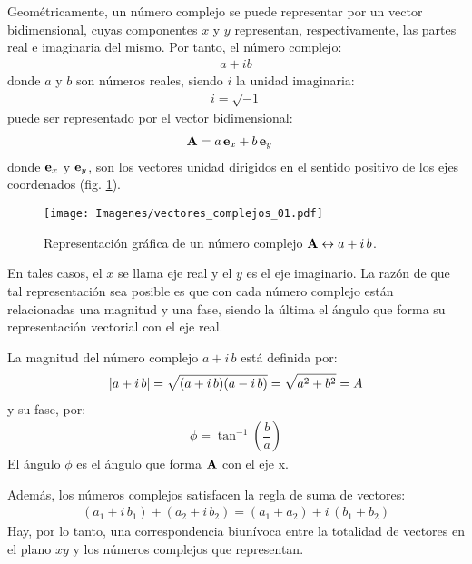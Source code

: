 \documentclass[12pt]{article}
\begin{document}
Geométricamente, un número complejo se puede representar por un vector bidimensional, cuyas componentes $x$ y $y$ representan, respectivamente, 
las partes real e imaginaria del mismo. Por tanto, el número complejo:
\begin{align}
    a + i b
    \label{eq:ecuacion_01_78}
\end{align}
donde $a$ y $b$ son números reales, siendo $i$ la unidad imaginaria:
\begin{align}
    i = \sqrt{-1}
    \label{eq:ecuacion_01_79}
\end{align}
puede ser representado por el vector bidimensional:
\begin{align}
    \vb{A} &= a \, \vb{e}_{x} + b \, \vb{e}_{y}
    \label{eq:ecuacion_01_80}
\end{align}
donde $\vb{e}_{x}$ y $\vb{e}_{y}$, son los vectores unidad dirigidos en el sentido positivo de los ejes coordenados (fig. \ref{fig:figura_01_23}). 
\begin{figure}[H]
    \centering
    \texttt{[image: Imagenes/vectores\_complejos\_01.pdf]}
    \caption{Representación gráfica de un número complejo $\vb{A} \leftrightarrow a + i \, b$.}
    \label{fig:figura_01_23}
\end{figure}
En tales casos, el $x$ se llama eje real y el $y$ es el eje imaginario. La razón de que tal representación sea posible es que con cada número complejo están relacionadas una magnitud y una fase, siendo la última el ángulo que forma su representación vectorial con el eje real.
\par
La magnitud del número complejo $a + i \, b$ está definida por:
\begin{align}
    \abs{a + i \, b} = \sqrt{(a + i \, b) (a - i \, b)} = \sqrt{a^{2} + b^{2}} = A
    \label{eq:ecuacion_01_81}
\end{align}
y su fase, por:
\begin{align}
    \phi = \tan^{-1} \left( \dfrac{b}{a} \right)
    \label{eq:ecuacion_01_82}
\end{align} 
El ángulo $\phi$ es el ángulo que forma $\vb{A}$ con el eje x.
\par
Además, los números complejos satisfacen la regla de suma de vectores:
\begin{align}
    \left( a_{1} + i \, b_{1} \right) + \left( a_{2} + i \, b_{2} \right) = \left( a_{1} + a_{2} \right) + i \, \left( b_{1} + b_{2} \right)
    \label{eq:ecuacion_01_83}
\end{align} 
Hay, por lo tanto, una correspondencia biunívoca entre la totalidad de vectores en el plano $xy$ y los números complejos que representan.
\end{document}
